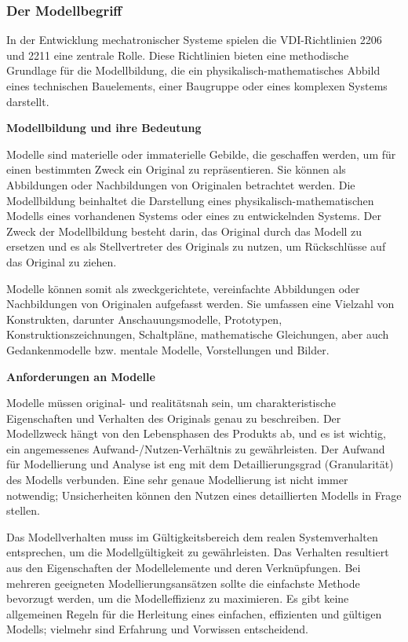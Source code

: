 \subsubsection{Der Modellbegriff}

In der Entwicklung mechatronischer Systeme spielen die VDI-Richtlinien 2206 und 2211 eine zentrale Rolle. Diese Richtlinien bieten eine methodische Grundlage für die Modellbildung, die ein physikalisch-mathematisches Abbild eines technischen Bauelements, einer Baugruppe oder eines komplexen Systems darstellt.

\textbf{Modellbildung und ihre Bedeutung}

Modelle sind materielle oder immaterielle Gebilde, die geschaffen werden, um für einen bestimmten Zweck ein Original zu repräsentieren. Sie können als Abbildungen oder Nachbildungen von Originalen betrachtet werden. Die Modellbildung beinhaltet die Darstellung eines physikalisch-mathematischen Modells eines vorhandenen Systems oder eines zu entwickelnden Systems. Der Zweck der Modellbildung besteht darin, das Original durch das Modell zu ersetzen und es als Stellvertreter des Originals zu nutzen, um Rückschlüsse auf das Original zu ziehen.

Modelle können somit als zweckgerichtete, vereinfachte Abbildungen oder Nachbildungen von Originalen aufgefasst werden. Sie umfassen eine Vielzahl von Konstrukten, darunter Anschauungsmodelle, Prototypen, Konstruktionszeichnungen, Schaltpläne, mathematische Gleichungen, aber auch Gedankenmodelle bzw. mentale Modelle, Vorstellungen und Bilder.

\textbf{Anforderungen an Modelle}

Modelle müssen original- und realitätsnah sein, um charakteristische Eigenschaften und Verhalten des Originals genau zu beschreiben. Der Modellzweck hängt von den Lebensphasen des Produkts ab, und es ist wichtig, ein angemessenes Aufwand-/Nutzen-Verhältnis zu gewährleisten. Der Aufwand für Modellierung und Analyse ist eng mit dem Detaillierungsgrad (Granularität) des Modells verbunden. Eine sehr genaue Modellierung ist nicht immer notwendig; Unsicherheiten können den Nutzen eines detaillierten Modells in Frage stellen.

Das Modellverhalten muss im Gültigkeitsbereich dem realen Systemverhalten entsprechen, um die Modellgültigkeit zu gewährleisten. Das Verhalten resultiert aus den Eigenschaften der Modellelemente und deren Verknüpfungen. Bei mehreren geeigneten Modellierungsansätzen sollte die einfachste Methode bevorzugt werden, um die Modelleffizienz zu maximieren. Es gibt keine allgemeinen Regeln für die Herleitung eines einfachen, effizienten und gültigen Modells; vielmehr sind Erfahrung und Vorwissen entscheidend.

